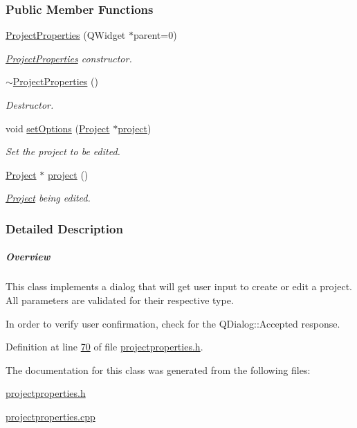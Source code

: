 \subsubsection*{Public Member Functions}
\begin{DoxyCompactItemize}
\item 
\hyperlink{group___window_gad98f3b25db75d19fc7d99b65157fc3f0}{Project\+Properties} (Q\+Widget $\ast$parent=0)
\begin{DoxyCompactList}\small\item\em \hyperlink{class_project_properties}{Project\+Properties} constructor. \end{DoxyCompactList}\item 
\hyperlink{group___window_ga8e0d4371b770784e85648926ded1f70a}{$\sim$\+Project\+Properties} ()
\begin{DoxyCompactList}\small\item\em Destructor. \end{DoxyCompactList}\item 
void \hyperlink{group___window_gaa9b9347f570a52e17e4debb4f03be625}{set\+Options} (\hyperlink{class_project}{Project} $\ast$\hyperlink{group___window_ga241ef3f82071d6091e4addbda53a634c}{project})
\begin{DoxyCompactList}\small\item\em Set the project to be edited. \end{DoxyCompactList}\item 
\hyperlink{class_project}{Project} $\ast$ \hyperlink{group___window_ga241ef3f82071d6091e4addbda53a634c}{project} ()
\begin{DoxyCompactList}\small\item\em \hyperlink{class_project}{Project} being edited. \end{DoxyCompactList}\end{DoxyCompactItemize}


\subsubsection{Detailed Description}
\subparagraph*{Overview}

This class implements a dialog that will get user input to create or edit a project. All parameters are validated for their respective type.

In order to verify user confirmation, check for the Q\+Dialog\+::\+Accepted response. 

Definition at line \hyperlink{projectproperties_8h_source_l00070}{70} of file \hyperlink{projectproperties_8h_source}{projectproperties.\+h}.



The documentation for this class was generated from the following files\+:\begin{DoxyCompactItemize}
\item 
\hyperlink{projectproperties_8h}{projectproperties.\+h}\item 
\hyperlink{projectproperties_8cpp}{projectproperties.\+cpp}\end{DoxyCompactItemize}
